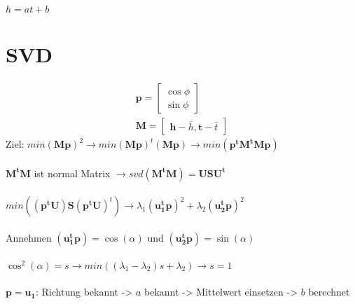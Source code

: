 \documentclass[12pt]{article}
\begin{document}
	\pagestyle{main}

$h = at+b$
\section{SVD}
\begin{gather}
	\bm{p} = \begin{bmatrix}
		\cos \phi \\
		\sin \phi
	\end{bmatrix}\\
	\bm{M} = \begin{bmatrix}
		\bm{h} - \bar{h}, \bm{t} - \bar{t}
	\end{bmatrix}
\end{gather}
Ziel: $min (\bm{Mp})^2 \rightarrow min(\bm{Mp})^t(\bm{Mp}) \rightarrow min(\bm{p^tM^tMp})$
\\\\
$\bm{M^tM}$ ist normal Matrix $\rightarrow svd(\bm{M^tM}) = \bm{U S U^t}$
\\\\
$min((\bm{p^tU}) \bm{S} (\bm{p^tU})^t) \rightarrow \lambda_1 (\bm{u_1^t p})^2 + \lambda_2 (\bm{u_2^t p})^2$
\\\\
Annehmen
$(\bm{u_1^t p}) = \cos(\alpha)$ und $(\bm{u_2^t p}) = \sin(\alpha)$ 
\\\\
$\cos^2(\alpha) = s \rightarrow min((\lambda_1 - \lambda_2)s + \lambda_2) \rightarrow s = 1$
\\\\
$\bm{p} = \bm{u_1}$: Richtung bekannt -> $a$ bekannt -> Mittelwert einsetzen -> $b$ berechnet
\end{document}
